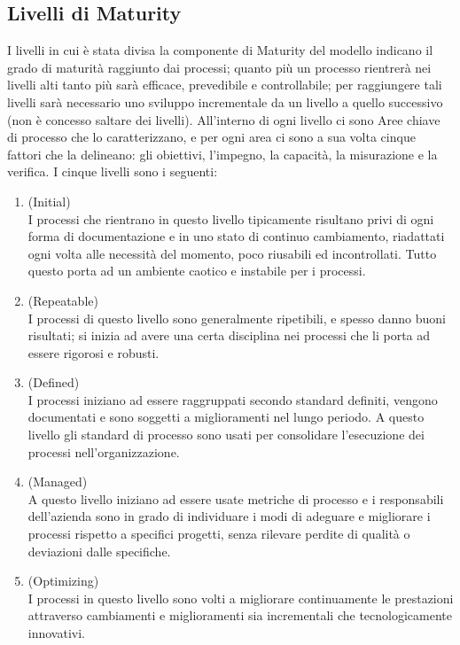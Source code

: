 \documentclass[a4paper, titlepage]{article}
\begin{document}
\subsection{Livelli di Maturity}
I livelli in cui è stata divisa la componente di Maturity del modello  indicano il grado di maturità raggiunto dai processi; quanto più un processo rientrerà nei livelli alti tanto più sarà efficace, prevedibile e controllabile; per raggiungere tali livelli sarà necessario uno sviluppo incrementale da un livello a quello successivo (non è concesso saltare dei livelli).
\newline All'interno di ogni livello ci sono Aree chiave di processo che lo caratterizzano, e per ogni area ci sono a sua volta cinque fattori che la delineano: gli obiettivi, l'impegno, la capacità, la misurazione e la verifica.
\newline I cinque livelli sono i seguenti:
\\
\begin{enumerate}
\item {} (Initial)
\\I processi che rientrano in questo livello tipicamente risultano privi di ogni forma di documentazione e in uno stato di continuo cambiamento, riadattati ogni volta alle necessità del momento, poco riusabili ed incontrollati. Tutto questo porta ad un ambiente caotico e instabile per i processi.

\item {} (Repeatable)
\\I processi di questo livello sono generalmente ripetibili, e spesso
danno buoni risultati; si inizia ad avere una certa disciplina nei processi che li porta ad essere rigorosi e robusti.

\item {} (Defined)
\\I processi iniziano ad essere raggruppati secondo standard definiti, vengono documentati e sono soggetti a miglioramenti nel lungo periodo. A questo livello gli standard di processo sono usati per consolidare l’esecuzione dei processi nell’organizzazione.

\item {} (Managed)
\\A questo livello iniziano ad essere usate metriche di processo e i responsabili dell’azienda sono in grado di individuare i modi di adeguare e migliorare i processi rispetto a specifici progetti, senza rilevare perdite di qualità o deviazioni dalle specifiche.

\item {} (Optimizing)
\\I processi in questo livello sono volti a migliorare continuamente
le prestazioni attraverso cambiamenti e miglioramenti sia incrementali che tecnologicamente innovativi.
\end{enumerate}
\end{document}
